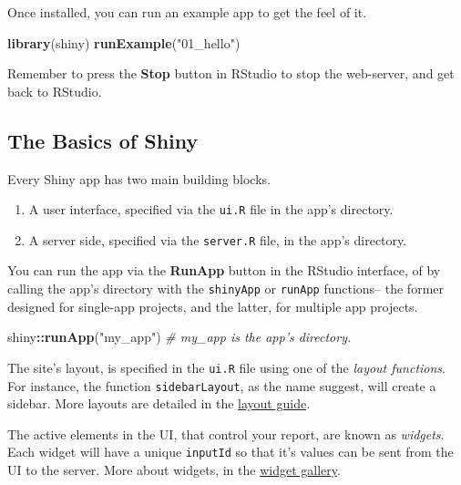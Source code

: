\documentclass[]{book}
\newenvironment{Shaded}{\begin{snugshade}}{\end{snugshade}}
\newcommand{\KeywordTok}[1]{\textcolor[rgb]{0.13,0.29,0.53}{\textbf{#1}}}
\newcommand{\StringTok}[1]{\textcolor[rgb]{0.31,0.60,0.02}{#1}}
\newcommand{\CommentTok}[1]{\textcolor[rgb]{0.56,0.35,0.01}{\textit{#1}}}
\newcommand{\OperatorTok}[1]{\textcolor[rgb]{0.81,0.36,0.00}{\textbf{#1}}}
\newcommand{\NormalTok}[1]{#1}
\providecommand{\tightlist}{%
  \setlength{\itemsep}{0pt}\setlength{\parskip}{0pt}}
\theoremstyle{definition}
\theoremstyle{definition}
\theoremstyle{definition}
\theoremstyle{remark}
\begin{document}
Once installed, you can run an example app to get the feel of it.

\begin{Shaded}
\begin{Highlighting}[]
\KeywordTok{library}\NormalTok{(shiny)}
\KeywordTok{runExample}\NormalTok{(}\StringTok{"01_hello"}\NormalTok{)}
\end{Highlighting}
\end{Shaded}

Remember to press the \textbf{Stop} button in RStudio to stop the
web-server, and get back to RStudio.

\subsection{The Basics of Shiny}\label{the-basics-of-shiny}

Every Shiny app has two main building blocks.

\begin{enumerate}
\def\labelenumi{\arabic{enumi}.}
\tightlist
\item
  A user interface, specified via the \texttt{ui.R} file in the app's
  directory.
\item
  A server side, specified via the \texttt{server.R} file, in the app's
  directory.
\end{enumerate}

You can run the app via the \textbf{RunApp} button in the RStudio
interface, of by calling the app's directory with the \texttt{shinyApp}
or \texttt{runApp} functions-- the former designed for single-app
projects, and the latter, for multiple app projects.

\begin{Shaded}
\begin{Highlighting}[]
\NormalTok{shiny}\OperatorTok{::}\KeywordTok{runApp}\NormalTok{(}\StringTok{"my_app"}\NormalTok{) }\CommentTok{# my_app is the app's directory.}
\end{Highlighting}
\end{Shaded}

The site's layout, is specified in the \texttt{ui.R} file using one of
the \emph{layout functions}. For instance, the function
\texttt{sidebarLayout}, as the name suggest, will create a sidebar. More
layouts are detailed in the
\href{http://shiny.rstudio.com/articles/layout-guide.html}{layout
guide}.

The active elements in the UI, that control your report, are known as
\emph{widgets}. Each widget will have a unique \texttt{inputId} so that
it's values can be sent from the UI to the server. More about widgets,
in the
\href{http://shiny.rstudio.com/gallery/widget-gallery.html}{widget
gallery}.
\end{document}
